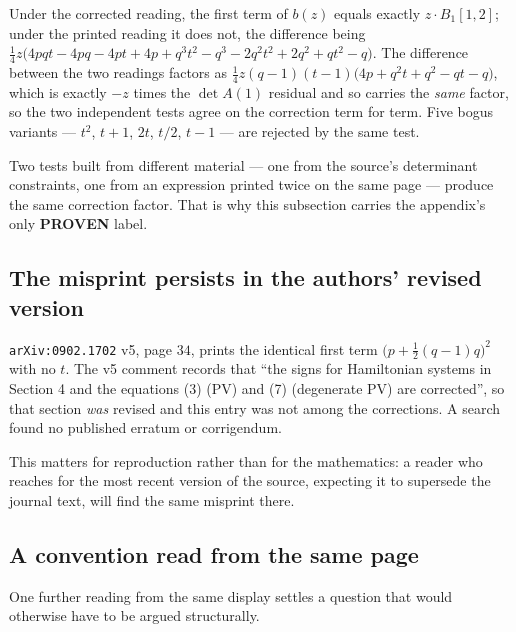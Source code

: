 \begin{remark}
Under the corrected reading, the first term of $b(z)$ equals exactly
$z\cdot B_1[1,2]$; under the printed reading it does not, the difference being
$\tfrac14 z\bigl(4pqt-4pq-4pt+4p+q^{3}t^{2}-q^{3}-2q^{2}t^{2}+2q^{2}+qt^{2}-q\bigr)$.
The difference between the two readings factors as
$\tfrac14 z(q-1)(t-1)\bigl(4p+q^{2}t+q^{2}-qt-q\bigr)$, which is exactly
$-z$ times the $\det A(1)$ residual and so carries the \emph{same} factor,
so the two independent tests agree on the correction term for term. Five bogus
variants --- $t^{2}$, $t+1$, $2t$, $t/2$, $t-1$ --- are rejected by the same
test.
\end{remark}

Two tests built from different material --- one from the source's determinant
constraints, one from an expression printed twice on the same page --- produce
the same correction factor. That is why this subsection carries the appendix's
only \textbf{PROVEN} label.

\subsection{The misprint persists in the authors' revised version}\label{ssec:typo-arxiv}

\begin{remark}
\texttt{arXiv:0902.1702} v5, page $34$, prints the identical first term
$\bigl(p+\tfrac12(q-1)q\bigr)^{2}$ with no $t$. The v5 comment records that
``the signs for Hamiltonian systems in Section 4 and the equations (3) (PV) and
(7) (degenerate PV) are corrected'', so that section \emph{was} revised and
this entry was not among the corrections. A search found no published erratum
or corrigendum.
\end{remark}

This matters for reproduction rather than for the mathematics: a reader who
reaches for the most recent version of the source, expecting it to supersede
the journal text, will find the same misprint there.

\subsection{A convention read from the same page}\label{ssec:typo-convention}

One further reading from the same display settles a question that would
otherwise have to be argued structurally.

